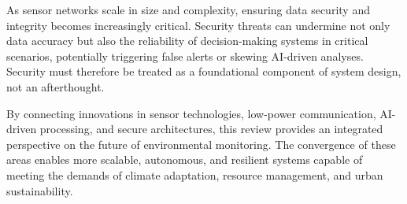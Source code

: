 \documentclass[conference]{IEEEtran}
\begin{document}
As sensor networks scale in size and complexity, ensuring data security and integrity becomes increasingly critical. Security threats can undermine not only data accuracy but also the reliability of decision-making systems in critical scenarios, potentially triggering false alerts or skewing AI-driven analyses. Security must therefore be treated as a foundational component of system design, not an afterthought.

By connecting innovations in sensor technologies, low-power communication, AI-driven processing, and secure architectures, this review provides an integrated perspective on the future of environmental monitoring. The convergence of these areas enables more scalable, autonomous, and resilient systems capable of meeting the demands of climate adaptation, resource management, and urban sustainability.
\end{document}
